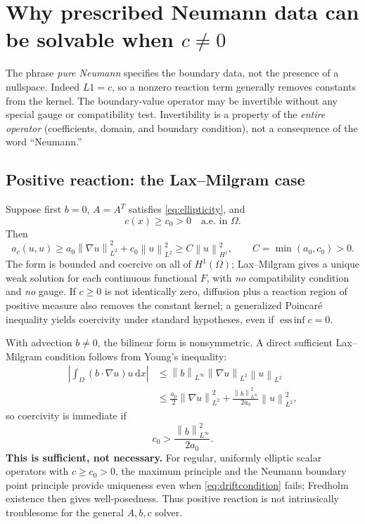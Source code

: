 \documentclass[11pt,letterpaper]{article}
\newcommand{\Om}{\Omega}
\newcommand{\dd}{\,\mathrm d}
\newcommand{\norm}[1]{\left\lVert#1\right\rVert}
\newcommand{\essinf}{\operatorname*{ess\,inf}}
\begin{document}
\section{Why prescribed Neumann data can be solvable when $c\ne0$}
The phrase \emph{pure Neumann} specifies the boundary data, not the presence
of a nullspace. Indeed $L1=c$, so a nonzero reaction term generally removes
constants from the kernel. The boundary-value operator may be invertible
without any special gauge or compatibility test. Invertibility is a property
of the \emph{entire operator} (coefficients, domain, and boundary condition),
not a consequence of the word ``Neumann.''

\subsection{Positive reaction: the Lax--Milgram case}
Suppose first $b=0$, $A=A^T$ satisfies \eqref{eq:ellipticity}, and
\begin{equation}\label{eq:cpositive}
 c(x)\ge c_0>0\quad\text{a.e. in }\Om.
\end{equation}
Then
\begin{equation}\label{eq:coercive}
 a_c(u,u)\ge a_0\norm{\nabla u}_{L^2}^2
                     +c_0\norm{u}_{L^2}^2
           \ge C\norm{u}_{H^1}^2,
 \qquad C=\min(a_0,c_0)>0.
\end{equation}
The form is bounded and coercive on all of $H^1(\Om)$; Lax--Milgram gives a
unique weak solution for each continuous functional $F$, with \emph{no}
compatibility condition and \emph{no} gauge. If $c\ge0$ is not identically
zero, diffusion plus a reaction region of positive measure also removes the
constant kernel; a generalized Poincar\'e inequality yields coercivity under
standard hypotheses, even if $\essinf c=0$.

With advection $b\ne0$, the bilinear form is nonsymmetric. A direct sufficient
Lax--Milgram condition follows from Young's inequality:
\begin{align}\label{eq:driftbound}
 \left|\int_\Om(b\cdot\nabla u)u\dd x\right|
 &\le\norm b_{L^\infty}\norm{\nabla u}_{L^2}\norm u_{L^2}\\
 &\le\frac{a_0}{2}\norm{\nabla u}_{L^2}^2
      +\frac{\norm b_{L^\infty}^2}{2a_0}\norm u_{L^2}^2,
\end{align}
so coercivity is immediate if
\begin{equation}\label{eq:driftcondition}
 c_0>\frac{\norm b_{L^\infty}^2}{2a_0}.
\end{equation}
\textbf{This is sufficient, not necessary.} For regular, uniformly elliptic
scalar operators with $c\ge c_0>0$, the maximum principle and the Neumann
boundary point principle provide uniqueness even when
\eqref{eq:driftcondition} fails; Fredholm existence then gives well-posedness.
Thus positive reaction is not intrinsically troublesome for the general
$A,b,c$ solver.
\end{document}
